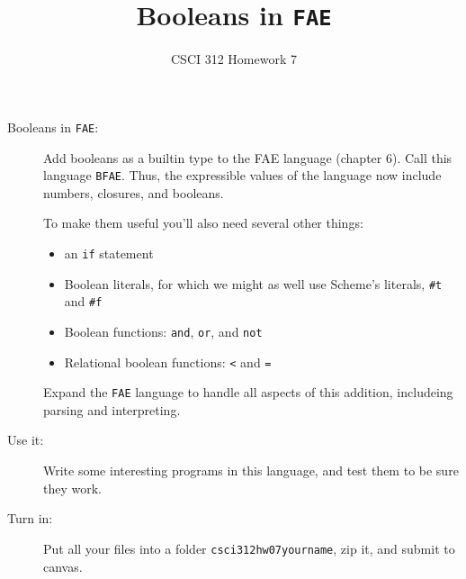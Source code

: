 \documentclass[12pt]{article}
\author{CSCI 312 Homework 7}
\title{Booleans in {\tt FAE}}
\begin{document}
\maketitle

\begin{description}

\item[Booleans in {\tt FAE}:]  Add booleans as a builtin type to the FAE
language (chapter 6).  Call this language {\tt BFAE}.  Thus, the expressible
values of the language now include numbers, closures, and booleans.
 
To make them useful you'll also need several other things:
\begin{itemize}
\item an {\tt if} statement
\item Boolean literals, for which we might as well use Scheme's literals,
\verb|#t| and \verb|#f|
\item Boolean functions:  {\tt and}, {\tt or}, and {\tt not}
\item Relational boolean functions:  \verb|<| and \verb|=|
\end{itemize}

Expand the {\tt FAE} language to handle all aspects of this
addition, includeing parsing and interpreting.

\item[Use it:]  Write some interesting programs in this language,
and test them to be sure they work.

\item[Turn in:] Put all your files into a folder {\tt csci312hw07yourname},
zip it, and submit to canvas.


\end{description}
\end{document}
